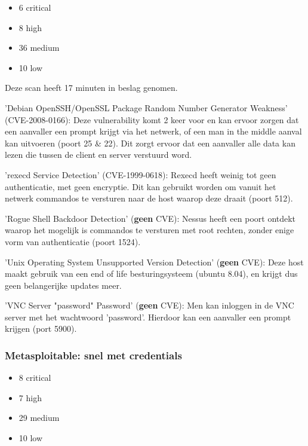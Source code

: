 
\begin{itemize}
\item 6 critical
\item 8 high
\item 36 medium
\item 10 low
\end{itemize}

Deze scan heeft 17 minuten in beslag genomen.

'Debian OpenSSH/OpenSSL Package Random Number Generator Weakness' (CVE-2008-0166): Deze vulnerability komt 2 keer voor en kan ervoor zorgen dat een aanvaller een prompt krijgt via het netwerk, of een man in the middle aanval kan uitvoeren (poort 25 \& 22). Dit zorgt ervoor dat een aanvaller alle data kan lezen die tussen de client en server verstuurd word.

'rexecd Service Detection' (CVE-1999-0618): Rexecd heeft weinig tot geen authenticatie, met geen encryptie. Dit kan gebruikt worden om vanuit het netwerk commandos te versturen naar de host waarop deze draait (poort 512). 

'Rogue Shell Backdoor Detection' (\textbf{geen} CVE): Nessus heeft een poort ontdekt waarop het mogelijk is commandos te versturen met root rechten, zonder enige vorm van authenticatie  (poort 1524).

'Unix Operating System Unsupported Version Detection' (\textbf{geen} CVE): Deze host maakt gebruik van een end of life besturingsysteem (ubuntu 8.04), en krijgt dus geen belangerijke updates meer.

'VNC Server "password" Password' (\textbf{geen} CVE): Men kan inloggen in de VNC server met het wachtwoord 'password'. Hierdoor kan een aanvaller een prompt krijgen (port 5900).

\subsubsection{Metasploitable: snel met credentials}

\begin{itemize}
\item 8 critical
\item 7 high
\item 29 medium
\item 10 low
\end{itemize}

